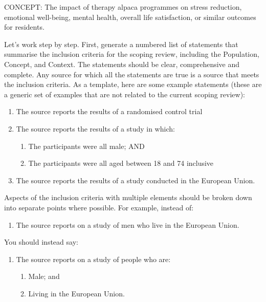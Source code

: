 \documentclass{article}
\begin{document}
\begin{description}
  CONCEPT: The impact of therapy alpaca programmes on stress reduction,
  emotional well-being, mental health, overall life satisfaction, or similar
  outcomes for residents.

  \System Let's work step by step. First, generate a numbered list of
  statements that summarise the inclusion criteria for the scoping review,
  including the Population, Concept, and Context. The statements should be
  clear, comprehensive and complete. Any source for which all the statements
  are true is a source that meets the inclusion criteria. As a template, here
  are some example statements (these are a generic set of examples that are not
  related to the current scoping review):

    \begin{enumerate}[label=\arabic*.\ ]
    \item The source reports the results of a randomised control trial
    \item The source reports the results of a study in which:
      \begin{enumerate}[label=\arabic{enumi}\alph*.\ ]
      \item The participants were all male; AND
      \item The participants were all aged between 18 and 74 inclusive
      \end{enumerate}
    \item The source reports the results of a study conducted in the European
          Union.
    \end{enumerate}

    Aspects of the inclusion criteria with multiple elements should be broken
    down into separate points where possible. For example, instead of:

    \begin{enumerate}[label=\arabic*.\ ]
      \item The source reports on a study of men who live in the European
            Union.
    \end{enumerate}

    You should instead say:

    \begin{enumerate}[label=\arabic*.\ ]
    \item The source reports on a study of people who are:
      \begin{enumerate}[label=\arabic{enumi}\alph*.\ ]
        \item Male; and
        \item Living in the European Union.
      \end{enumerate}
    \end{enumerate}


\end{description}
\end{document}
